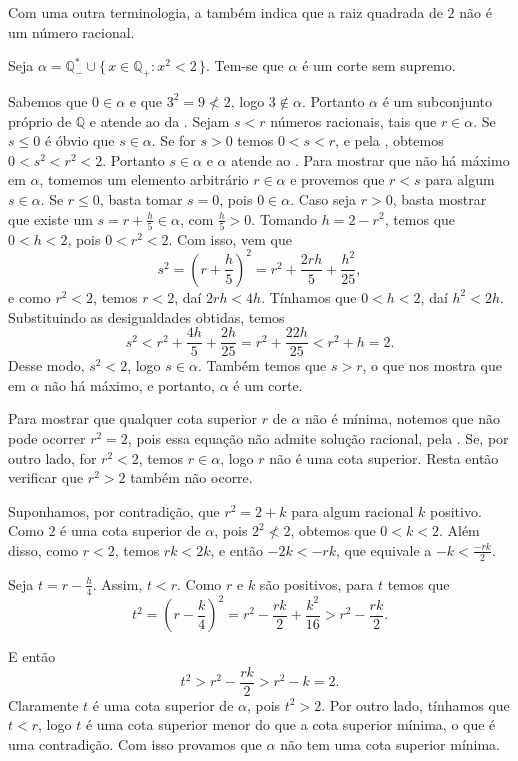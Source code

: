 \documentclass[../main.tex]{subfiles}
\begin{document}
\begin{obs}
    Com uma outra terminologia, a  também indica que a raiz quadrada de $2$ não é um número racional.
\end{obs}

\begin{prop}\label{reais-prop-corteRaizDoisNaoRacional}
    Seja $\alpha = \mathbb{Q}_{-}^* \cup \{\, x \in \mathbb{Q}_{+} : x^2 < 2 \,\}$. Tem-se que $\alpha$ é um corte sem supremo.
\end{prop}
\begin{dem}
   Sabemos que $0 \in \alpha$ e que $3^2 = 9 \not< 2$, logo $3 \not\in \alpha$. Portanto $\alpha$ é um subconjunto próprio de $\mathbb{Q}$ e atende ao  da . 
   Sejam $s < r$ números racionais, tais que $r \in \alpha$. Se $s \leq 0$ é óbvio que $s \in \alpha$. Se for $s > 0$ temos $0 < s < r$, e pela
   , obtemos $0 < s^2 < r^2 < 2$. Portanto $s \in \alpha$ e $\alpha$ atende ao .
   Para mostrar que não há máximo em $\alpha$, tomemos um elemento arbitrário $r \in \alpha$ e provemos que $r < s$ para algum $s \in \alpha$. Se $r \leq 0$, basta tomar $s = 0$, pois $0 \in \alpha$. Caso seja $r > 0$, basta mostrar que existe um $s = r + \frac{h}{5} \in \alpha$, com $\frac{h}{5} > 0$.  
   Tomando $h = 2 - r^2$, temos que $0 < h < 2$, pois $0< r^2 < 2$. Com isso, vem que
   \[ s^2 = \left( r+ \frac{h}{5} \right)^2 = r^2 + \frac{2rh}{5}+ \frac{h^2}{25}, \]
    e como $r^2 < 2$, temos $r<2$, daí $2rh < 4h$. Tínhamos que $0 < h < 2$, daí $h^2 < 2h$. Substituindo as desigualdades obtidas, temos
    \[ s^2 < r^2 + \frac{4h}{5} + \frac{2h}{25}  = r^2 + \frac{22h}{25} < r^2 + h = 2. \]
    Desse modo, $s^2 < 2$, logo $s \in \alpha$. Também temos que $s>r$, o que nos mostra que em $\alpha$ não há máximo, e portanto, $\alpha$ é um corte.

    Para mostrar que qualquer cota superior $r$ de $\alpha$ não é mínima, notemos que não pode ocorrer $r^2 = 2$, pois essa equação não admite solução racional, pela . Se, por outro lado, for $r^2<2$, temos $r \in \alpha$, logo $r$ não é uma cota superior. Resta então verificar que $r^2 > 2$ também não ocorre. 

    Suponhamos, por contradição, que $r^2 = 2+ k$ para algum racional $k$ positivo. Como $2$ é uma cota superior de $\alpha$, pois $2^2 \not< 2$, obtemos que $0 < k < 2$. Além disso, como $r < 2$, temos $rk < 2k$, e então $-2k < -rk$, que equivale a $-k < \frac{-rk}{2}$.
    
    Seja $t = r - \frac{h}{4}$. Assim, $t < r$. Como $r$ e $k$ são positivos, para $t$ temos que
    \[ t^2 = \left( r - \frac{k}{4} \right)^2 = r^2 - \frac{rk}{2} + \frac{k^2}{16} > r^2 - \frac{rk}{2}. \]

    E então
    \[ t^2 > r^2 - \frac{rk}{2} > r^2-k = 2. \]
    Claramente $t$ é uma cota superior de $\alpha$, pois $t^2 >  2$. Por outro lado, tínhamos que $t < r$, logo $t$ é uma cota superior menor do que a cota superior mínima, o que é uma contradição. Com isso provamos que $\alpha$ não tem uma cota superior mínima.
\end{dem}
\end{document}
